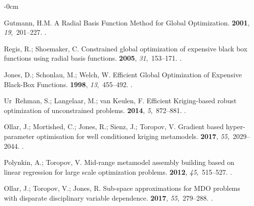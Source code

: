 \documentclass[mathematics,article,accept,pdftex,moreauthors]{Definitions/mdpi}
\begin{document}
\begin{adjustwidth}{-\extralength}{0cm}
\begin{thebibliography}{999}
Gutmann, H.M.
\newblock A Radial Basis Function Method for Global Optimization.
 {\bf 2001}, {\em 19},~201--227.
.



Regis, R.; Shoemaker, C.
\newblock Constrained global optimization of expensive black box functions
  using radial basis functions.
 {\bf 2005}, {\em 31},~153--171.
.

\newpage

Jones, D.; Schonlau, M.; Welch, W.
\newblock Efficient Global Optimization of Expensive Black-Box Functions.
 {\bf 1998}, {\em 13},~455--492.
.

Ur~Rehman, S.; Langelaar, M.; van Keulen, F.
\newblock Efficient Kriging-based robust optimization of unconstrained
  problems.
 {\bf 2014}, {\em 5},~872--881.
.

Ollar, J.; Mortished, C.; Jones, R.; Sienz, J.; Toropov, V.
\newblock Gradient based hyper-parameter optimisation for well conditioned
  kriging metamodels.
 {\bf 2017}, {\em
  55},~2029--2044.
.

Polynkin, A.; Toropov, V.
\newblock Mid-range metamodel assembly building based on linear regression for
  large scale optimization problems.
 {\bf 2012}, {\em
  45},~515--527.
.

Ollar, J.; Toropov, V.; Jones, R.
\newblock Sub-space approximations for MDO problems with disparate disciplinary
  variable dependence.
 {\bf 2017}, {\em
  55},~279--288.
.


\end{thebibliography}
\end{adjustwidth}
\end{document}
